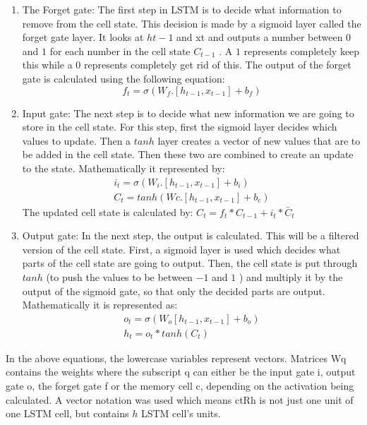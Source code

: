     \begin{enumerate}
    	\item The Forget gate: The first step in LSTM is to decide what information to remove from the cell state. This decision is made by a sigmoid layer called the forget gate layer. It looks at $h{t-1}$  and xt and outputs a number between $0$ and $1$  for each number in the cell state $C_{t-1} $ . A $1$ represents completely keep this while a $0$  represents completely get rid of this. The output of the forget gate is calculated using the following equation: 
    	 \begin{equation}
    	 f_t=\sigma(W_f.[h_{t-1},x_{t-1}]+b_f)
    	 \end{equation}
    	 \item Input gate: The next step is to decide what new information we are going to store in the cell state. For this step, first the sigmoid layer decides which values to update. Then a $tanh$ layer creates a vector of new values that are to be added in the cell state. Then these two are combined to create an update to the state. Mathematically it represented by: 
    	 \begin{gather}
    	 i_t=\sigma (W_i.[h_{t-1},x_{t-1}]+b_i)	\\		
    	 C_t=tanh(Wc.[h_{t-1},x_{t-1}]+b_c)
    	 \end{gather}
    	 The updated cell state is calculated by: $C_t=f_t*C_{t-1}+i_t*\bar{C}_t$
    	 \item Output gate: In the next step, the output is calculated. This will be a filtered version of the cell state. First, a sigmoid layer is used which decides what parts of the cell state are going to output. Then, the cell state is put through $tanh$ (to push the values to be between $-1$ and $1$ ) and multiply it by the output of the sigmoid gate, so that only the decided parts are output. Mathematically it is represented as: 
    	  \begin{gather}
    	o_t=\sigma (W_o[h_{t-1},x_{t-1}]+b_o)\\				
    	h_t=o_t*tanh(C_t)
    	  \end{gather}
    	 
    \end{enumerate}
 
 In the above equations, the lowercase variables represent vectors. Matrices Wq contains the weights where the subscript q can either be the input gate i, output gate o, the forget gate f or the memory cell c, depending on the activation being calculated. A vector notation was used which means ctRh is not just one unit of one LSTM cell, but contains $h$ LSTM cell's units.
 
